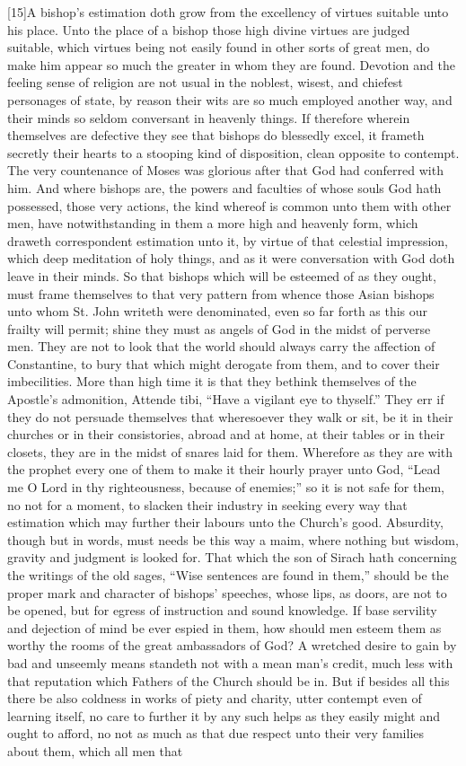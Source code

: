 [15]A bishop’s estimation doth grow from the excellency of virtues suitable unto his place. Unto the place of a bishop those high divine virtues are judged suitable, which virtues being not easily found in other sorts of great men, do make him appear so much the greater in whom they are found. Devotion and the feeling sense of religion are not usual in the noblest, wisest, and chiefest personages of state, by reason their wits are so much employed another way, and their minds so seldom conversant in heavenly things. If therefore wherein themselves are defective they see that bishops do blessedly excel, it frameth secretly their hearts to a stooping kind of disposition, clean opposite to contempt. The very countenance of Moses was glorious after that God had conferred with him. And where bishops are, the powers and faculties of whose souls God hath possessed, those very actions, the kind whereof is common unto them with other men, have notwithstanding in them a more high and heavenly form, which draweth correspondent estimation unto it, by virtue of that celestial impression, which deep meditation of holy things, and as it were conversation with God doth leave in their minds. So that bishops which will be esteemed of as they ought, must frame themselves to that very pattern from whence those Asian bishops unto whom St. John writeth were denominated, even so far forth as this our frailty will permit; shine they must as angels of God in the midst of perverse men. They are not to look that the world should always carry the affection of Constantine, to bury that  which might derogate from them, and to cover their imbecilities. More than high time it is that they bethink themselves of the Apostle’s admonition, Attende tibi, “Have a vigilant eye to thyself.” They err if they do not persuade themselves that wheresoever they walk or sit, be it in their churches or in their consistories, abroad and at home, at their tables or in their closets, they are in the midst of snares laid for them. Wherefore as they are with the prophet every one of them to make it their hourly prayer unto God, “Lead me O Lord in thy righteousness, because of enemies;” so it is not safe for them, no not for a moment, to slacken their industry in seeking every way that estimation which may further their labours unto the Church’s good. Absurdity, though but in words, must needs be this way a maim, where nothing but wisdom, gravity and judgment is looked for. That which the son of Sirach hath concerning the writings of the old sages, “Wise sentences are found in them,” should be the proper mark and character of bishops’ speeches, whose lips, as doors, are not to be opened, but for egress of instruction and sound knowledge. If base servility and dejection of mind be ever espied in them, how should men esteem them as worthy the rooms of the great ambassadors of God? A wretched desire to gain by bad and unseemly means standeth not with a mean man’s credit, much less with that reputation which Fathers of the Church should be in. But if besides all this there be also coldness in works of piety and charity, utter contempt even of learning itself, no care to further it by any such helps as they easily might and ought to afford, no not as much as that due respect unto their very families about them, which all men that 
